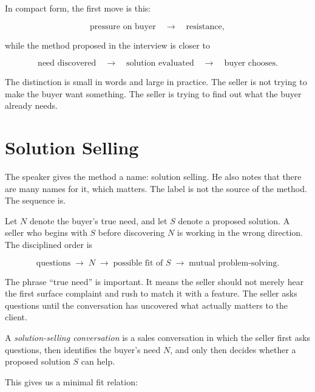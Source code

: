 In compact form, the first move is this:

\begin{equation}
\text{pressure on buyer}
\quad \longrightarrow \quad
\text{resistance},
\end{equation}

while the method proposed in the interview is closer to

\begin{equation}
\text{need discovered}
\quad \longrightarrow \quad
\text{solution evaluated}
\quad \longrightarrow \quad
\text{buyer chooses}.
\end{equation}

The distinction is small in words and large in practice. The seller is not trying to make the buyer want something. The seller is trying to find out what the buyer already needs.

\section{Solution Selling}

The speaker gives the method a name: solution selling. He also notes that there are many names for it, which matters. The label is not the source of the method. The sequence is.

Let \(N\) denote the buyer's true need, and let \(S\) denote a proposed solution. A seller who begins with \(S\) before discovering \(N\) is working in the wrong direction. The disciplined order is

\begin{equation}
\text{questions}
\;\longrightarrow\;
N
\;\longrightarrow\;
\text{possible fit of } S
\;\longrightarrow\;
\text{mutual problem-solving}.
\end{equation}

The phrase ``true need'' is important. It means the seller should not merely hear the first surface complaint and rush to match it with a feature. The seller asks questions until the conversation has uncovered what actually matters to the client.

\begin{definition}
A \emph{solution-selling conversation} is a sales conversation in which the seller first asks questions, then identifies the buyer's need \(N\), and only then decides whether a proposed solution \(S\) can help.
\end{definition}

This gives us a minimal fit relation:

